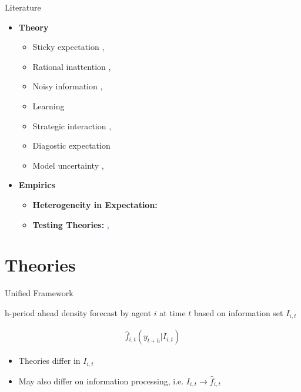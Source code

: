 \documentclass{beamer}
\begin{document}
\begin{frame}{Literature}
\begin{itemize}
	\item \textbf{Theory}
	\begin{itemize}
		\item Sticky expectation \cite{carroll2003macroeconomic}, \cite{reis2006inattentive}
		\item Rational inattention \cite{sims2003implications},  \cite{gabaix2014sparsity}
		\item Noisy information \cite{lucas1972expectations}, \cite{woodford2001imperfect}
	\item Learning \cite{evans2012learning}
	\item Strategic interaction \cite{morris2002social}, \cite{hellwig2009knowing}
	\item Diagostic expectation  \cite{bordalo2018diagnostic}
	\item Model uncertainty \cite{hansen2001robust}, \cite{hansen2008robustness}
	\end{itemize}
\item \textbf{Empirics}
\begin{itemize}
	\item \textbf{Heterogeneity in Expectation:} \cite{mankiw2003disagreement}
	\item \textbf{Testing Theories:}  \textcolor{blue}{\cite{coibion2012can}, \cite{fuhrer2018intrinsic}}
\end{itemize}
\end{itemize}
\end{frame}

\section{Theories}

\begin{frame}{Unified Framework}

h-period ahead density forecast by agent $i$ at time $t$ based on information set $I_{i,t}$

\begin{eqnarray*}
	\widehat f_{i,t}(y_{t+h}|I_{i,t})
\end{eqnarray*}

\begin{itemize}
	\item Theories differ in $I_{i,t}$
	\item May also differ on information processing, i.e. $I_{i,t} \rightarrow \widehat f_{i,t}$
\end{itemize}

\end{frame}
\end{document}
